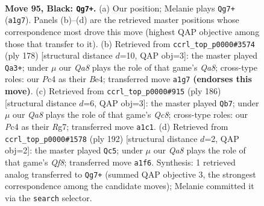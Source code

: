 \documentclass[11pt]{article}
\begin{document}
\clearpage

\begin{figure}[p]\centering
\begin{subfigure}{0.46\textwidth}\centering
\resizebox{\linewidth}{!}{%
\newchessgame
\chessboard[
  setfen={8/8/8/8/2p1k3/6K1/8/q2q4 b - - 1 95},
  showmover=false,
  pgfstyle=straightmove, color=movearrow, markmove={a1-g7}
]}
\caption{}
\end{subfigure}\hfill
\begin{subfigure}{0.46\textwidth}\centering
\resizebox{\linewidth}{!}{%
\newchessgame
\chessboard[
  setfen={Q5Q1/8/7K/2k5/4B3/8/8/8 w - - 1 90},
  showmover=false,
  pgfstyle=straightmove, color=movearrow, markmove={a8-a3}
]}
\caption{}
\end{subfigure}
\\[4pt]
\begin{subfigure}{0.46\textwidth}\centering
\resizebox{\linewidth}{!}{%
\newchessgame
\chessboard[
  setfen={2Q2Q2/6R1/8/8/8/3K4/k7/8 w - - 1 94},
  showmover=false,
  pgfstyle=straightmove, color=movearrow, markmove={c8-b7}
]}
\caption{}
\end{subfigure}\hfill
\begin{subfigure}{0.46\textwidth}\centering
\resizebox{\linewidth}{!}{%
\newchessgame
\chessboard[
  setfen={4QQ2/8/8/8/8/3k2K1/8/8 w - - 1 97},
  showmover=false,
  pgfstyle=straightmove, color=movearrow, markmove={f8-c5}
]}
\caption{}
\end{subfigure}
\caption{\textbf{Move 95, Black: \texttt{Qg7+}.} (a) Our position; Melanie plays \texttt{Qg7+} (\texttt{a1g7}). Panels (b)--(d) are the retrieved master positions whose correspondence most drove this move (highest QAP objective among those that transfer to it). (b) Retrieved from \texttt{ccrl\_top\_p0000\#3574} (ply 178) [structural distance $d$=10, QAP obj=3]: the master played \texttt{Qa3+}; under $\mu$ our \emph{Qa8} plays the role of that game's \emph{Qa8}; cross-type roles: our \emph{P}c4 as their \emph{B}e4; transferred move \texttt{a1g7} \textbf{(endorses this move)}. (c) Retrieved from \texttt{ccrl\_top\_p0000\#915} (ply 186) [structural distance $d$=6, QAP obj=3]: the master played \texttt{Qb7}; under $\mu$ our \emph{Qa8} plays the role of that game's \emph{Qc8}; cross-type roles: our \emph{P}c4 as their \emph{R}g7; transferred move \texttt{a1c1}. (d) Retrieved from \texttt{ccrl\_top\_p0000\#1578} (ply 192) [structural distance $d$=2, QAP obj=2]: the master played \texttt{Qc5}; under $\mu$ our \emph{Qa8} plays the role of that game's \emph{Qf8}; transferred move \texttt{a1f6}. Synthesis: 1 retrieved analog transferred to \texttt{Qg7+} (summed QAP objective 3, the strongest correspondence among the candidate moves); Melanie committed it via the \texttt{search} selector.}
\label{fig:thought-m189}
\end{figure}
\end{document}
